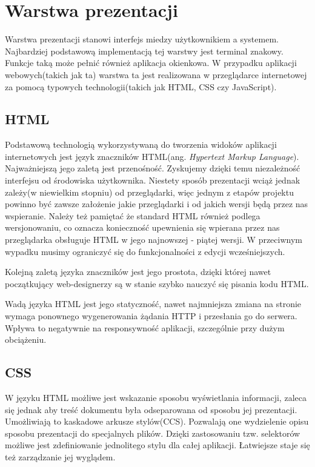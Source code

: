 \section[Warstwa prezentacji][Warstwa prezentacji]{Warstwa prezentacji}
Warstwa prezentacji stanowi interfejs miedzy użytkownikiem a systemem. Najbardziej podstawową implementacją tej warstwy jest terminal znakowy. Funkcje taką może pełnić również aplikacja okienkowa. W przypadku aplikacji webowych(takich jak ta) warstwa ta jest realizowana w przeglądarce internetowej za pomocą typowych technologii(takich jak HTML, CSS czy JavaScript).

\subsection[HTML][HTML]{HTML}
Podstawową technologią wykorzystywaną do tworzenia widoków aplikacji internetowych jest język znaczników HTML(ang. \textit{Hypertext Markup Language}). Najważniejszą jego zaletą jest przenośność. Zyskujemy dzięki temu niezależność interfejsu od środowiska użytkownika. Niestety sposób prezentacji wciąż jednak zależy(w niewielkim stopniu) od przeglądarki, więc jednym z etapów projektu powinno być zawsze założenie jakie przeglądarki i od jakich wersji będą przez nas wspieranie. Należy też pamiętać że standard HTML również podlega wersjonowaniu, co oznacza konieczność upewnienia się wpierana przez nas przeglądarka obsługuje HTML w jego najnowszej - piątej wersji. W przeciwnym wypadku musimy ograniczyć się do funkcjonalności z edycji wcześniejszych.

Kolejną zaletą języka znaczników jest jego prostota, dzięki której nawet początkujący web-designerzy są w stanie szybko nauczyć się pisania kodu HTML.

Wadą języka HTML jest jego statyczność, nawet najmniejsza zmiana na stronie wymaga ponownego wygenerowania żądania HTTP i przesłania go do serwera. Wpływa to negatywnie na responsywność aplikacji, szczególnie przy dużym obciążeniu. 

\subsection[CSS][CSS]{CSS}
W języku HTML możliwe jest wskazanie sposobu wyświetlania informacji, zaleca się jednak aby treść dokumentu była odseparowana od sposobu jej prezentacji. Umożliwiają to kaskadowe arkusze stylów(CCS). Pozwalają one wydzielenie opisu sposobu prezentacji do specjalnych plików. Dzięki zastosowaniu tzw. selektorów możliwe jest zdefiniowanie jednolitego stylu dla całej aplikacji. Łatwiejsze staje się też zarządzanie jej wyglądem.

